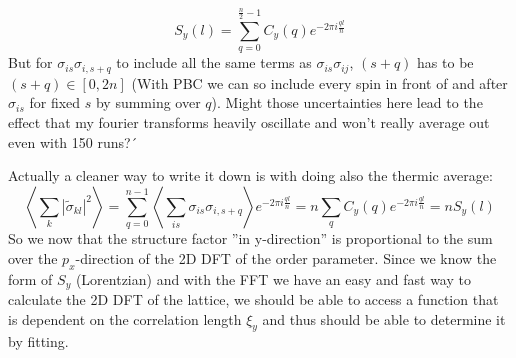 	\begin{equation}
		S_y(l) = \sum_{q =	0}^{\frac{n}{2} - 1} C_y(q) e^{-2 \pi i \frac{ql}{n}}
	\end{equation}
	But for  $ \sigma_{is} \sigma_{i,s+q}$ to include all the same terms as $ \sigma_{is} \sigma_{ij}$, $(s+q)$ has to be $(s+q) \in \left[0, 2n\right]$ (With PBC we can so include every spin in front of and after $\sigma_{is}$ for fixed $s$ by summing over $q$). Might those uncertainties here lead to the effect that my fourier transforms heavily oscillate and won't really average out even with 150 runs?´
	
	Actually a cleaner way to write it down is with doing also the thermic average:
	\begin{equation}
		\left \langle \sum_k |\tilde{\sigma}_{kl}|^2 \right \rangle  =	 \sum_{q=0}^{n - 1}  \left\langle \sum_{is}^{} \sigma_{is} \sigma_{i,s+q} \right\rangle e^{-2 \pi i \frac{ql}{n}} =	n \sum_q C_y(q) e^{-2 \pi i \frac{ql}{n}} =	n S_y(l)
	\end{equation}
	So we now that the structure factor ''in y-direction''	is proportional to the sum over the $p_x$-direction of the 2D DFT of the order parameter. Since we know the form of $S_y$ (Lorentzian) and with the FFT we have an easy and fast way to calculate the 2D DFT of the lattice, we should be able to access a function that is dependent on the correlation length $\xi_y$ and thus should be able to determine it by fitting.
	
